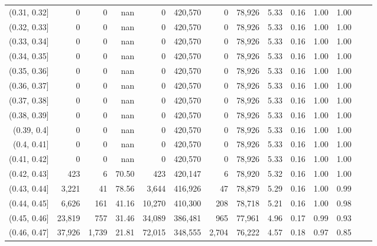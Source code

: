 \begin{tabular}{rrrrrrrrrrrrrr}
(0.31, 0.32]   &       0 &       0 &    nan &        0 &  420,570 &       0 &  78,926 &  5.33 &  0.16 &  1.00 &      1.00 \\
(0.32, 0.33]   &       0 &       0 &    nan &        0 &  420,570 &       0 &  78,926 &  5.33 &  0.16 &  1.00 &      1.00 \\
(0.33, 0.34]   &       0 &       0 &    nan &        0 &  420,570 &       0 &  78,926 &  5.33 &  0.16 &  1.00 &      1.00 \\
(0.34, 0.35]   &       0 &       0 &    nan &        0 &  420,570 &       0 &  78,926 &  5.33 &  0.16 &  1.00 &      1.00 \\
(0.35, 0.36]   &       0 &       0 &    nan &        0 &  420,570 &       0 &  78,926 &  5.33 &  0.16 &  1.00 &      1.00 \\
(0.36, 0.37]   &       0 &       0 &    nan &        0 &  420,570 &       0 &  78,926 &  5.33 &  0.16 &  1.00 &      1.00 \\
(0.37, 0.38]   &       0 &       0 &    nan &        0 &  420,570 &       0 &  78,926 &  5.33 &  0.16 &  1.00 &      1.00 \\
(0.38, 0.39]   &       0 &       0 &    nan &        0 &  420,570 &       0 &  78,926 &  5.33 &  0.16 &  1.00 &      1.00 \\
(0.39, 0.4]    &       0 &       0 &    nan &        0 &  420,570 &       0 &  78,926 &  5.33 &  0.16 &  1.00 &      1.00 \\
(0.4, 0.41]    &       0 &       0 &    nan &        0 &  420,570 &       0 &  78,926 &  5.33 &  0.16 &  1.00 &      1.00 \\
(0.41, 0.42]   &       0 &       0 &    nan &        0 &  420,570 &       0 &  78,926 &  5.33 &  0.16 &  1.00 &      1.00 \\
(0.42, 0.43]   &     423 &       6 &  70.50 &      423 &  420,147 &       6 &  78,920 &  5.32 &  0.16 &  1.00 &      1.00 \\
(0.43, 0.44]   &   3,221 &      41 &  78.56 &    3,644 &  416,926 &      47 &  78,879 &  5.29 &  0.16 &  1.00 &      0.99 \\
(0.44, 0.45]   &   6,626 &     161 &  41.16 &   10,270 &  410,300 &     208 &  78,718 &  5.21 &  0.16 &  1.00 &      0.98 \\
(0.45, 0.46]   &  23,819 &     757 &  31.46 &   34,089 &  386,481 &     965 &  77,961 &  4.96 &  0.17 &  0.99 &      0.93 \\
(0.46, 0.47]   &  37,926 &   1,739 &  21.81 &   72,015 &  348,555 &   2,704 &  76,222 &  4.57 &  0.18 &  0.97 &      0.85 \\

\end{tabular}
